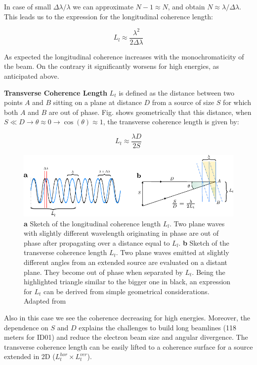 In case of small $\Delta \lambda / \lambda $ we can approximate $N-1 \approx N$, and obtain $N \approx \lambda / \Delta \lambda$. 
This leads us to the expression for the longitudinal coherence length: 

\begin{equation}
    L_l \approx \frac{\lambda^2}{2\Delta \lambda}
\end{equation}

As expected the longitudinal coherence increases with the monochromaticity of the beam. On the contrary it significantly 
worsens for high energies, as anticipated above. 

\textbf{Transverse Coherence Length} $L_t$ is defined as the distance between two points $A$ and $B$ sitting on a plane at distance $D$ from a 
source of size $ S$ for which both $A$ and $B$ are out of phase. Fig. shows geometrically that this distance, 
when $S \ll D \rightarrow \theta \approx 0 \rightarrow \cos(\theta)\approx 1$, the transverse coherence length is given by: 

\begin{equation}
    L_t \approx \frac{\lambda D}{2 S}
\end{equation}

\begin{figure}[H]
    \centering
    \includegraphics[width=\textwidth]{figures/Intro/coherence.pdf}
    \caption{\textbf{a} Sketch of the longitudinal coherence length $L_l$. Two plane waves with slightly different wavelength 
    originating in phase are out of phase after propagating over a distance equal to $L_l$. \textbf{b} Sketch of the 
    transverse coherence length $L_t$. Two plane waves emitted at slightly different angles from an extended source 
    are evaluated on a distant plane. They become out of phase when separated by $L_t$. 
    Being the highlighted triangle similar to the bigger one in black, an expression for $L_t$ can be derived from 
    simple geometrical considerations. Adapted from \cite{girard:tel-02906931}}
    \label{fig:coherence}
\end{figure}

Also in this case we see the coherence decreasing for high energies.
Moreover, the dependence on $S$ and $D$ explains the challenges to build long beamlines (118 meters for ID01) and
reduce the electron beam size and angular divergence. The transverse coherence length can be easily lifted to a coherence surface 
for a source extended in 2D ($L_t^{hor} \times L_t^{ver}$).\\

